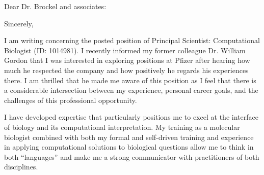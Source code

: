 \documentclass[11pt,letterpaper,sans]{moderncv}
\begin{document}
\date{\today}
\opening{Dear Dr. Brockel and associates:}
\closing{Sincerely,}
\makelettertitle

\vspace{-0.5\baselineskip}
I am writing concerning the posted position of Principal Scientist: Computational Biologist (ID: 1014981).
I recently informed my former colleague Dr. William Gordon that I was interested in exploring positions at Pfizer after hearing how much he respected the company and how positively he regards his experiences there.
I am thrilled that he made me aware of this position as I feel that there is a considerable intersection between my experience, personal career goals, and the challenges of this professional opportunity.



I have developed expertise that particularly positions me to excel at the interface of biology and its computational interpretation.
My training as a molecular biologist combined with both my formal and self-driven training and experience in applying computational solutions to biological questions allow me to think in both ``languages'' and make me a strong communicator with practitioners of both disciplines.
\end{document}
